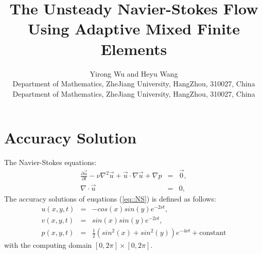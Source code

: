 \documentclass{article}
\title{The Unsteady Navier-Stokes Flow Using Adaptive Mixed Finite Elements
} %
\author{Yirong Wu and Heyu Wang \\
  \small Department of Mathematics, ZheJiang University, HangZhou,
  310027, China\\
  \small Department of Mathematics, ZheJiang University, HangZhou,
  310027, China }
\begin{document}
\maketitle %



\begin{abstract}
\end{abstract}
\section{Accuracy Solution}
The Navier-Stokes equations:
\begin{equation}
  \begin{array}{rcl}
    \frac{\partial \vec{u}}{\partial t}-\nu \nabla^2 \vec{u} +
    \vec{u} \cdot \nabla \vec{u} + \nabla p & =
    & \vec{0},\\
    \nabla \cdot \vec{u} & = & 0,
  \end{array}
  \label{eq::NS}
\end{equation}
The accuracy solutions of euqations (\ref{eq::NS}) is defined as
follows:
\begin{equation}
  \begin{array}{rcl}
    u(x, y, t) & = & -cos(x)sin(y)e^{-2 \nu t},\\
    v(x, y, t) & = & sin(x)sin(y)e^{-2 \nu t}, \\
    p(x, y, t) & = & \frac{1}{2}(sin^2(x) + sin^2(y)) e^{-4 \nu t} + \text{constant}
  \end{array}
  \label{eq::accuracy_solution}
\end{equation}
with the computing domain $[0, 2 \pi] \times [0, 2 \pi]$.
\end{document}
